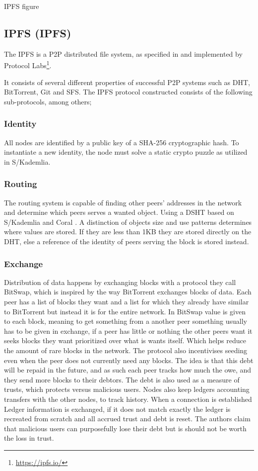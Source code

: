 IPFS figure

\subsection{\acl{IPFS} (\ac{IPFS})}
The \ac{IPFS} is a \ac{P2P} distributed file system, as specified in \cite{benet2014ipfs} and implemented by Protocol Labs\footnote{\url{https://ipfs.io/}}.

It consists of several different properties of successful \ac{P2P} systems such as \ac{DHT}, BitTorrent, Git and \ac{SFS}. The \ac{IPFS} protocol constructed consists of the following sub-protocols, among others;

\subsubsection{Identity}
All nodes are identified by a public key of a SHA-256 cryptographic hash. To instantiate a new identity, the node must solve a static crypto puzzle as utilized in S/Kademlia\cite{baumgart2007skademlia}.

\subsubsection{Routing}
The routing system is capable of finding other peers' addresses in the network and determine which peers serves a wanted object. Using a \ac{DSHT} based on S/Kademlia and Coral \cite{baumgart2007skademlia, freedman2004coral}. A distinction of objects size and use patterns determines where values are stored. If they are less than 1KB they are stored directly on the \ac{DHT}, else a reference of the identity of peers serving the block is stored instead. 

\subsubsection{Exchange}
Distribution of data happens by exchanging blocks with a protocol they call BitSwap, which is inspired by the way BitTorrent exchanges blocks of data. Each peer has a list of blocks they want and a list for which they already have similar to BitTorrent but instead it is for the entire network. In BitSwap value is given to each block, meaning to get something from a another peer something usually has to be given in exchange, if a peer has little or nothing the other peers want it seeks blocks they want prioritized over what is wants itself. Which helps reduce the amount of rare blocks in the network.
The protocol also incentivises seeding even when the peer does not currently need any blocks. The idea is that this debt will be repaid in the future, and as such each peer tracks how much the owe, and they send more blocks to their debtors. The debt is also used as a measure of trusts, which protects versus malicious users.
Nodes also keep ledgers accounting transfers with the other nodes, to track history. When a connection is established Ledger information is exchanged, if it does not match exactly the ledger is recreated from scratch and all accrued trust and debt is reset. The authors claim that malicious users can purposefully lose their debt but is should not be worth the loss in trust.

